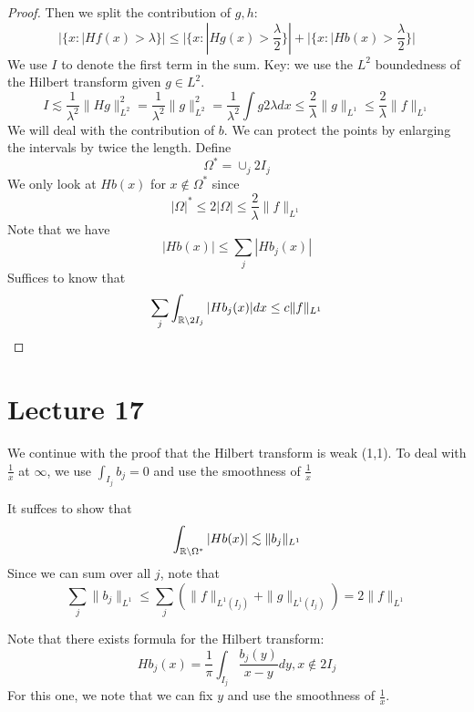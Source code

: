 \begin{proof}
    Then we split the contribution of $g,h$:
    \begin{equation*}
        |\{x: |Hf(x)>\lambda\}|\leq |\{x: |Hg(x)>\frac{\lambda}{2}\}|+|\{x: |Hb(x)>\frac{\lambda}{2}\}|
    \end{equation*}
   We use $I$ to denote the first term in the sum. Key: we use the $L^2$ boundedness of the Hilbert transform given $g\in L^2$.
   \begin{equation*}
    I\lesssim\frac{1}{\lambda^2}\|Hg\|_{L^2}^2=\frac{1}{\lambda^2}\|g\|_{L^2}^2=\frac{1}{\lambda^2}\int g 2\lambda dx\leq\frac{2}{\lambda}\|g\|_{L^1}\leq\frac{2}{\lambda}\|f\|_{L^1}
   \end{equation*}
   We will deal with the contribution of $b$. We can protect the points by enlarging the intervals by twice the length. Define
   \begin{equation*}
        \Omega^*=\cup_j2I_j
   \end{equation*}
   We only look at $Hb(x)$ for $x\not\in\Omega^*$ since
   \begin{equation*}
    |\Omega|^*\leq 2|\Omega|\leq\frac{2}{\lambda}\|f\|_{L^1}
   \end{equation*}
   Note that we have
   \begin{equation*}
    |Hb(x)|\leq\sum_j|Hb_j(x)|
   \end{equation*}
   Suffices to know that
   \begin{equation*}
    \sum_j\int_{\mathbb{R}\setminus 2I_j}|Hb_j(x)|dx\leq c\|f\|_{L^1}
   \end{equation*}
\end{proof}

\section{Lecture 17}
We continue with the proof that the Hilbert transform is weak (1,1).
To deal with $\frac{1}{x}$ at $\infty$, we use $\int_{I_j}b_j=0$ and use the smoothness of $\frac{1}{x}$

It suffces to show that
\begin{equation*}
    \int_{\mathbb{R}\setminus\Omega^*}|Hb(x)|\lesssim \|b_j\|_{L^1}
\end{equation*}
Since we can sum over all $j$, note that
\begin{equation*}
    \sum_j\|b_j\|_{L^1}\leq\sum_j\left(\|f\|_{L^1(I_j)}+\|g\|_{L^1(I_j)} \right)=2\|f\|_{L^1}
\end{equation*}

Note that there exists formula for the Hilbert transform:
\begin{equation*}
    Hb_j(x)=\frac{1}{\pi}\int_{I_j}\frac{b_j(y)}{x-y}dy, x\not\in 2I_j
\end{equation*}
For this one, we note that we can fix $y$ and use the smoothness of $\frac{1}{x}$.

